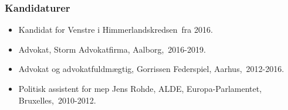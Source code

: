\documentclass[11pt, a4paper]{awesome-cv}
\begin{document}
\begin{cvletter}
\subsubsection*{Kandidaturer}
\begin{itemize}
\item Kandidat for Venstre i Himmerlandskredsen fra 2016.
\end{itemize}
\begin{itemize}
\item Advokat, Storm Advokatfirma, Aalborg, 2016-2019.
\item Advokat og advokatfuldmægtig, Gorrissen Federspiel, Aarhus, 2012-2016.
\item Politisk assistent for mep Jens Rohde, ALDE, Europa-Parlamentet, Bruxelles, 2010-2012.
\end{itemize}
\end{cvletter}
\end{document}
